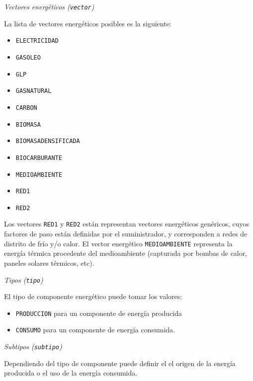 \documentclass[10pt,notitlepage,oneside,a4paper]{article}
\begin{document}
\textit{Vectores energéticos (\texttt{vector})}

La lista de vectores energéticos posibles es la siguiente:

\begin{multicols}{3}
\begin{itemize}
\item \texttt{ELECTRICIDAD}
\item \texttt{GASOLEO}
\item \texttt{GLP}
\item \texttt{GASNATURAL}
\item \texttt{CARBON}
\item \texttt{BIOMASA}
\item \texttt{BIOMASADENSIFICADA}
\item \texttt{BIOCARBURANTE}
\item \texttt{MEDIOAMBIENTE}
\item \texttt{RED1}
\item \texttt{RED2}
\end{itemize}
\end{multicols}

Los vectores \texttt{RED1} y \texttt{RED2} están representan vectores energéticos genéricos, cuyos factores de paso están definidas por el suministrador, y corresponden a redes de distrito de frío y/o calor. El vector energético \texttt{MEDIOAMBIENTE} representa la energía térmica procedente del medioambiente (capturada por bombas de calor, paneles solares térmicos, etc).

\textit{Tipos (\texttt{tipo})}

El tipo de componente energético puede tomar los valores:

\begin{itemize}
\item \texttt{PRODUCCION} para un componente de energía producida
\item \texttt{CONSUMO} para un componente de energía consumida.
\end{itemize}

\textit{Subtipos (\texttt{subtipo})}

Dependiendo del tipo de componente puede definir el el origen de la energía producida o el uso de la energía consumida.
\end{document}

